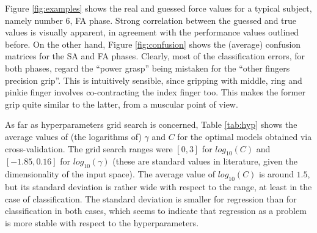 \documentclass[10pt]{bmc_article}
\def\texttt{[image: ]}
\newenvironment{bmcformat}
  {\begin{raggedright}\baselineskip20pt\sloppy\setboolean{publ}{false}}
  {\end{raggedright}\baselineskip20pt\sloppy}
\begin{document}
\begin{bmcformat}
Figure \ref{fig:examples} shows the real and guessed force values for a
typical subject, namely number $6$, FA phase. Strong correlation between
the guessed and true values is visually apparent, in agreement with the
performance values outlined before.
On the other hand, Figure \ref{fig:confusion} shows the (average)
confusion matrices for the SA and FA phases. Clearly, most of the classification
errors, for both phases, regard the ``power grasp'' being mistaken for the
``other fingers precision grip''. This is intuitively sensible, since gripping
with middle, ring and pinkie finger involves co-contracting the index finger too.
This makes the former grip quite similar to the latter, from a muscular point
of view.



As far as hyperparameters grid search is concerned,
Table \ref{tab:hyp} shows the average values of (the logarithms of)
$\gamma$ and $C$ for the optimal models obtained via cross-validation.
The grid search ranges were $[0,3]$ for $log_{10}(C)$ and
$[-1.85,0.16]$ for $log_{10}(\gamma)$ (these are standard values in
literature, given the dimensionality of the input space). The average value of
$log_{10}(C)$ is around $1.5$, but its standard deviation is rather wide
with respect to the range, at least in the case of
classification. The standard deviation is smaller for regression than
for classification in both cases, which seems to indicate that
regression as a problem is more stable with respect to the
hyperparameters.


\end{bmcformat}
\end{document}
